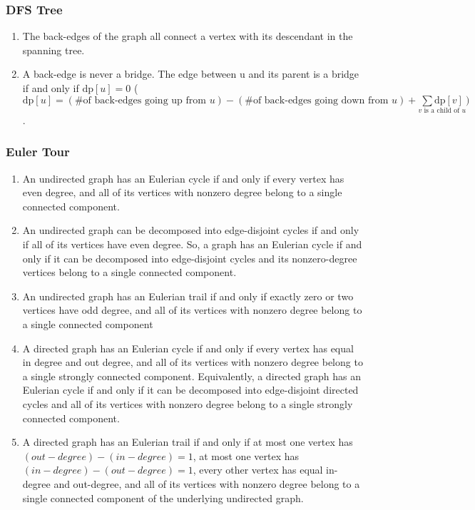 \subsubsection{DFS Tree}
\begin{enumerate}
	\setlength\itemsep{-0.5em}
	\item The back-edges of the graph all connect a vertex with its descendant in the spanning tree.
	\item A back-edge is never a bridge. The edge between u and its parent is a bridge if and only if $\mathrm{dp}[u] = 0$ ( $\mathrm{dp}[u] = (\text{\# of back-edges going up from } u) - (\text{\# of back-edges going down from } u) + \underset{v \text{ is a child of } u}{\sum \mathrm{dp}[v]} )$.
\end{enumerate}
\subsubsection{Euler Tour}
\begin{enumerate}
	\setlength\itemsep{-0.5em}
	\item An undirected graph has an Eulerian cycle if and only if every vertex has even degree, and all of its vertices with nonzero degree belong to a single connected component.
	\item An undirected graph can be decomposed into edge-disjoint cycles if and only if all of its vertices have even degree. So, a graph has an Eulerian cycle if and only if it can be decomposed into edge-disjoint cycles and its nonzero-degree vertices belong to a single connected component.
	\item An undirected graph has an Eulerian trail if and only if exactly zero or two vertices have odd degree, and all of its vertices with nonzero degree belong to a single connected component
	\item A directed graph has an Eulerian cycle if and only if every vertex has equal in degree and out degree, and all of its vertices with nonzero degree belong to a single strongly connected component. Equivalently, a directed graph has an Eulerian cycle if and only if it can be decomposed into edge-disjoint directed cycles and all of its vertices with nonzero degree belong to a single strongly connected component.
	\item A directed graph has an Eulerian trail if and only if at most one vertex has $(out-degree) − (in-degree) = 1$, at most one vertex has $(in-degree) − (out-degree) = 1$, every other vertex has equal in-degree and out-degree, and all of its vertices with nonzero degree belong to a single connected component of the underlying undirected graph.
\end{enumerate}

